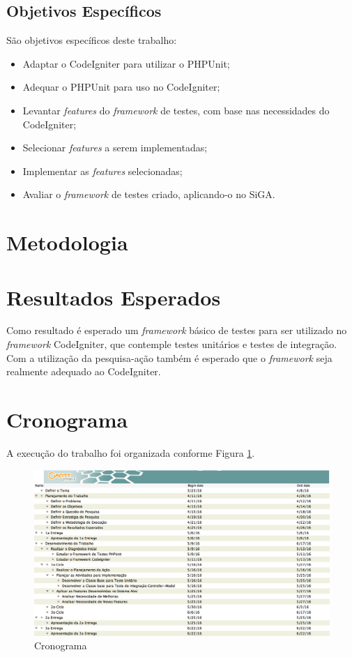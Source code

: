\subsection{Objetivos Específicos}

São objetivos específicos deste trabalho:

\begin{itemize}
 \item Adaptar o CodeIgniter para utilizar o PHPUnit;
 \item Adequar o PHPUnit para uso no CodeIgniter;
 \item Levantar \textit{features} do \textit{framework} de testes, com base nas necessidades do CodeIgniter;
 \item Selecionar \textit{features} a serem implementadas;
 \item Implementar as \textit{features} selecionadas;
 \item Avaliar o \textit{framework} de testes criado, aplicando-o no SiGA.
\end{itemize}


\section{Metodologia}

	

\section{Resultados Esperados}

Como resultado é esperado um \textit{framework} básico de testes para ser utilizado no \textit{framework} CodeIgniter, que contemple
testes unitários e testes de integração. Com a utilização da pesquisa-ação também é esperado que o \textit{framework} seja realmente adequado
ao CodeIgniter. 

\section{Cronograma}

A execução do trabalho foi organizada conforme Figura \ref{fig:cronograma}.

\begin{figure}[!htb]
\includegraphics[scale=0.45]{figuras/Cronograma.png}
\caption{Cronograma}
\label{fig:cronograma}
\end{figure}
